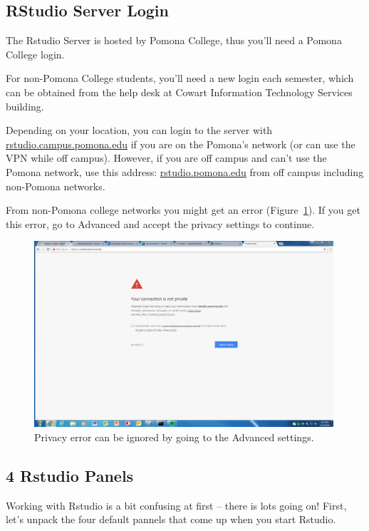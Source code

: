 \documentclass[12pt]{../SOP4_alpha}\usepackage[]{graphicx}\usepackage[]{color}
\begin{document}
\subsection{RStudio Server Login}

\NP The Rstudio Server is hosted by Pomona College, thus you'll need a Pomona College login. 

\NP For non-Pomona College students, you'll need a new login each semester, which can be obtained from the help desk at Cowart Information Technology Services building.

\NP Depending on your location, you can login to the server with \url{rstudio.campus.pomona.edu} if you are on the Pomona's network (or can use the VPN while off campus). However, if you are off campus and can't use the Pomona network, use this address: \url{rstudio.pomona.edu} from off campus including non-Pomona networks.

\NP From non-Pomona college networks you might get an error (Figure~\ref{fig:privacyerror}). If you get this error, go to Advanced and accept the privacy settings to continue.

\begin{figure}[t]
\centering
\includegraphics[width=0.99\textwidth]{graphics/Connect_Web_Privacy.JPG}
\caption{Privacy error can be ignored by going to the Advanced settings.}
\label{fig:privacyerror}
\end{figure}


\subsection{4 Rstudio Panels}

Working with Rstudio is a bit confusing at first -- there is lots going on! First, let's unpack the four default pannels that come up when you start Rstudio. 
\end{document}

